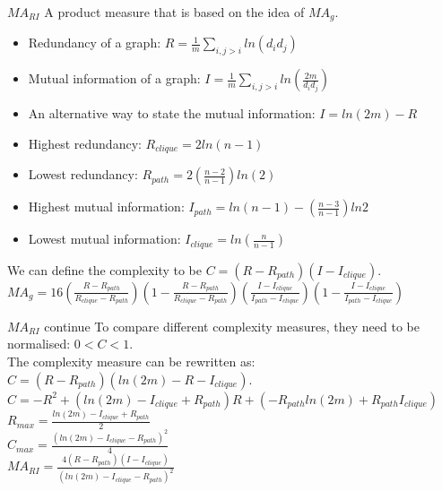 \documentclass{beamer}
\begin{document}
    \begin{frame}{$MA_{RI}$}
        A product measure that is based on the idea of $MA_g$.
        \begin{itemize}
            \item Redundancy of a graph: $R=\frac{1}{m}\sum_{i,j>i}ln(d_id_j)$
            \item Mutual information of a graph: $I=\frac{1}{m}\sum_{i,j>i}ln(\frac{2m}{d_id_j})$
            \item An alternative way to state the mutual information: $I=ln(2m)-R$
            \item Highest redundancy: $R_{clique} = 2ln(n-1)$
            \item Lowest redundancy: $R_{path} = 2(\frac{n-2}{n-1})ln(2)$
            \item Highest mutual information: $I_{path} = ln(n-1)-(\frac{n-3}{n-1})ln2$
            \item Lowest mutual information: $I_{clique}=ln(\frac{n}{n-1})$
        \end{itemize}
        We can define the complexity to be $C = (R - R_{path})(I-I_{clique})$.\\
        $MA_g=16(\frac{R-R_{path}}{R_{clique}-R_{path}})(1-\frac{R-R_{path}}{R_{clique}-R_{path}})(\frac{I-I_{clique}}{I_{path}-I_{clique}})(1-\frac{I-I_{clique}}{I_{path}-I_{clique}})$
    \end{frame}

    \begin{frame}{$MA_{RI}$ continue}
        To compare different complexity measures, they need to be normalised: $0<C<1$.\\
        The complexity measure can be rewritten as: $C=(R-R_{path})(ln(2m)-R-I_{clique})$.\\
        \vspace{5mm}
        \centering
        $C = -R^2+(ln(2m)-I_{clique}+R_{path})R+(-R_{path}ln(2m)+R_{path}I_{clique})$
    \\
        \vspace{5mm}
        $R_{max} = \frac{ln(2m)-I_{clique}+R_{path}}{2}$\\
        \vspace{5mm}
        $C_{max} = \frac{(ln(2m)-I_{clique}-R_{path})^2}{4}$\\
        \vspace{5mm}
        $MA_{RI} = \frac{4(R-R_{path})(I-I_{clique})}{(ln(2m)-I_{clique}-R_{path})^2}$
    \end{frame}
\end{document}
